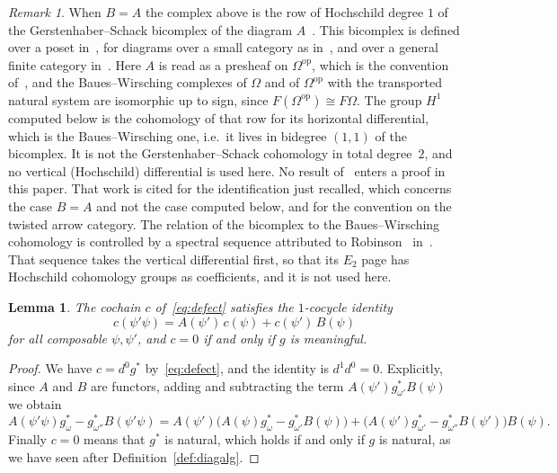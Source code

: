 \documentclass[11pt,a4paper]{article}
\theoremstyle{plain}
\newtheorem{lemma}[theorem]{Lemma}
\theoremstyle{definition}
\theoremstyle{remark}
\newtheorem{remark}[theorem]{Remark}
\newcommand{\cat}[1]{\mathsf{#1}}
\newcommand{\catO}{\cat{\Omega}}
\newcommand{\op}{\mathrm{op}}
\begin{document}
\begin{remark}\label{rem:GS}
When $B = A$ the complex above is the row of Hochschild degree $1$ of the
Gerstenhaber--Schack bicomplex of the diagram
$A$~\cite[Prop.~3.8]{caputi_diagrammatic_2025}. This bicomplex is defined over
a poset in~\cite{gerstenhaber_schack_1983}, for diagrams over a small category
as in~\cite[\S2]{gerstenhaber_simplicial_1983}, and over a general finite
category in~\cite[eq.~(4)]{caputi_diagrammatic_2025}. Here $A$ is read as a
presheaf on $\catO^{\op}$, which is the convention
of~\cite{caputi_diagrammatic_2025}, and the Baues--Wirsching complexes of
$\catO$ and of $\catO^{\op}$ with the transported natural system are
isomorphic up to sign, since $F(\catO^{\op}) \cong F\catO$. The group $H^{1}$
computed below is the cohomology of that row for its horizontal
differential, which is the Baues--Wirsching one, i.e.\ it lives in bidegree
$(1,1)$ of the bicomplex. It is not the Gerstenhaber--Schack cohomology in
total degree~$2$, and no vertical (Hochschild) differential is used here. No
result of~\cite{caputi_diagrammatic_2025} enters a proof in this paper. That
work is cited for the identification just recalled, which concerns the case
$B = A$ and not the case computed below, and for the convention on the twisted
arrow category. The relation of the bicomplex to the Baues--Wirsching
cohomology is controlled by a spectral sequence attributed to
Robinson~\cite{robinson_cohomology_2008}
in~\cite[\S1, Prop.~3.10 and Thm.~3.11]{caputi_diagrammatic_2025}. That
sequence takes the vertical differential first, so that its $E_2$ page has
Hochschild cohomology groups as coefficients, and it is not used here.
\end{remark}

\begin{lemma}\label{lem:cocycle}
The cochain $c$ of~\eqref{eq:defect} satisfies the $1$-cocycle identity
\[
c(\psi'\psi) = A(\psi')\,c(\psi) + c(\psi')\,B(\psi)
\]
for all composable $\psi,\psi'$, and $c = 0$ if and only if $g$ is
meaningful.
\end{lemma}

\begin{proof}
We have $c = d^{0}g^{*}$ by~\eqref{eq:defect}, and the identity is
$d^{1}d^{0} = 0$. Explicitly, since $A$ and $B$ are functors, adding and
subtracting the term $A(\psi')g^{*}_{\omega'}B(\psi)$ we obtain
\[
A(\psi'\psi)g^{*}_{\omega} - g^{*}_{\omega''}B(\psi'\psi)
= A(\psi')\bigl(A(\psi)g^{*}_{\omega} - g^{*}_{\omega'}B(\psi)\bigr)
+ \bigl(A(\psi')g^{*}_{\omega'} - g^{*}_{\omega''}B(\psi')\bigr)B(\psi).
\]
Finally $c = 0$ means that $g^{*}$ is natural, which holds if and only if $g$
is natural, as we have seen after Definition~\ref{def:diagalg}.
\end{proof}
\end{document}
